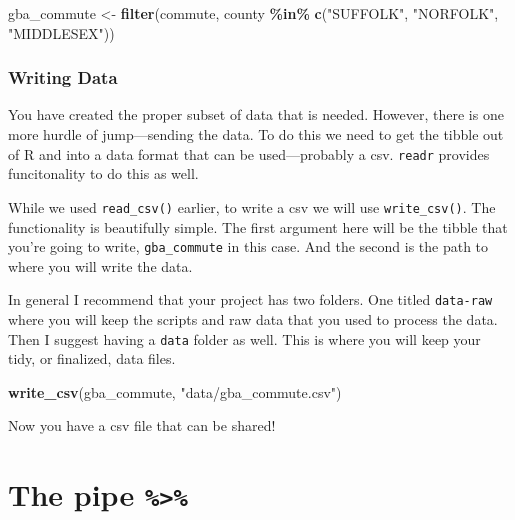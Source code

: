 \documentclass[
]{book}
\newenvironment{Shaded}{\begin{snugshade}}{\end{snugshade}}
\newcommand{\KeywordTok}[1]{\textcolor[rgb]{0.13,0.29,0.53}{\textbf{#1}}}
\newcommand{\NormalTok}[1]{#1}
\newcommand{\OperatorTok}[1]{\textcolor[rgb]{0.81,0.36,0.00}{\textbf{#1}}}
\newcommand{\StringTok}[1]{\textcolor[rgb]{0.31,0.60,0.02}{#1}}
\begin{document}
\begin{Shaded}
\begin{Highlighting}[]
\NormalTok{gba\_commute \textless{}{-}}\StringTok{ }\KeywordTok{filter}\NormalTok{(commute, county }\OperatorTok{\%in\%}\StringTok{ }\KeywordTok{c}\NormalTok{(}\StringTok{"SUFFOLK"}\NormalTok{, }\StringTok{"NORFOLK"}\NormalTok{, }\StringTok{"MIDDLESEX"}\NormalTok{))}
\end{Highlighting}
\end{Shaded}

\hypertarget{writing-data}{%
\subsection{Writing Data}\label{writing-data}}

You have created the proper subset of data that is needed. However, there is one more hurdle of jump---sending the data. To do this we need to get the tibble out of R and into a data format that can be used---probably a csv. \texttt{readr} provides funcitonality to do this as well.

While we used \texttt{read\_csv()} earlier, to write a csv we will use \texttt{write\_csv()}. The functionality is beautifully simple. The first argument here will be the tibble that you're going to write, \texttt{gba\_commute} in this case. And the second is the path to where you will write the data.

In general I recommend that your project has two folders. One titled \texttt{data-raw} where you will keep the scripts and raw data that you used to process the data. Then I suggest having a \texttt{data} folder as well. This is where you will keep your tidy, or finalized, data files.

\begin{Shaded}
\begin{Highlighting}[]
\KeywordTok{write\_csv}\NormalTok{(gba\_commute, }\StringTok{"data/gba\_commute.csv"}\NormalTok{)}
\end{Highlighting}
\end{Shaded}

Now you have a csv file that can be shared!

\hypertarget{the-pipe}{%
\chapter{\texorpdfstring{The pipe \texttt{\%\textgreater{}\%}}{The pipe \%\textgreater\%}}\label{the-pipe}}
\end{document}
